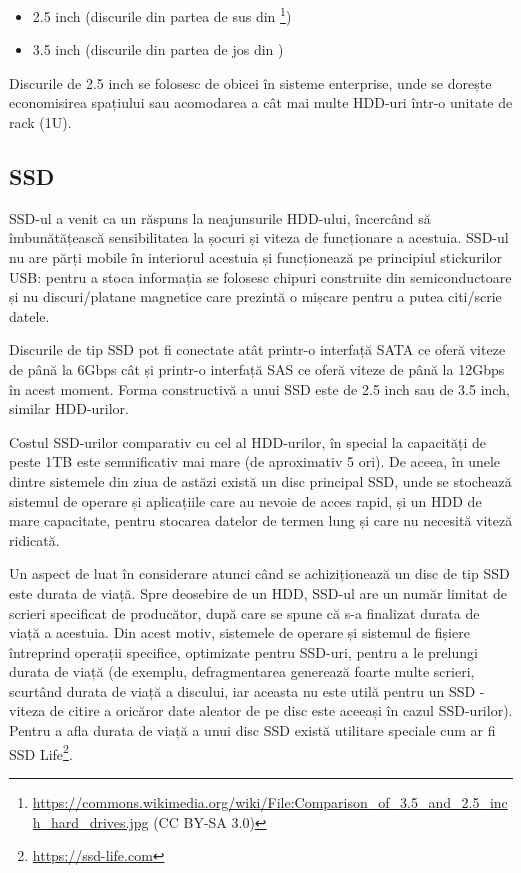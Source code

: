 \begin{itemize}
  \item 2.5 inch (discurile din partea de sus din \footnote{\url{https://commons.wikimedia.org/wiki/File:Comparison\_of\_3.5\_and\_2.5\_inch\_hard\_drives.jpg} (CC BY-SA 3.0)})
  \item 3.5 inch (discurile din partea de jos din )
\end{itemize}

Discurile de 2.5 inch se folosesc de obicei în sisteme enterprise, unde se dorește economisirea spațiului sau acomodarea a cât mai multe HDD-uri într-o unitate de rack (1U).

\subsection{SSD}
\label{sec:storage:type:ssd}

SSD-ul a venit ca un răspuns la neajunsurile HDD-ului, încercând să îmbunătățească sensibilitatea la șocuri și viteza de funcționare a acestuia.
SSD-ul nu are părți mobile în interiorul acestuia și funcționează pe principiul stickurilor USB: pentru a stoca informația se folosesc chipuri construite din semiconductoare și nu discuri/platane magnetice care prezintă o mișcare pentru a putea citi/scrie datele.

Discurile de tip SSD pot fi conectate atât printr-o interfață SATA ce oferă viteze de până la 6Gbps cât și printr-o interfață SAS ce oferă viteze de până la 12Gbps în acest moment.
Forma constructivă a unui SSD este de 2.5 inch sau de 3.5 inch, similar HDD-urilor.

Costul SSD-urilor comparativ cu cel al HDD-urilor, în special la capacități de peste 1TB este semnificativ mai mare (de aproximativ 5 ori).
De aceea, în unele dintre sistemele din ziua de astăzi există un disc principal SSD, unde se stochează sistemul de operare și aplicațiile care au nevoie de acces rapid, și un HDD de mare capacitate, pentru stocarea datelor de termen lung și care nu necesită viteză ridicată.

Un aspect de luat în considerare atunci când se achiziționează un disc de tip SSD este durata de viață.
Spre deosebire de un HDD, SSD-ul are un număr limitat de scrieri specificat de producător, după care se spune că s-a finalizat durata de viață a acestuia.
Din acest motiv, sistemele de operare și sistemul de fișiere întreprind operații specifice, optimizate pentru SSD-uri, pentru a le prelungi durata de viață (de exemplu, defragmentarea generează foarte multe scrieri, scurtând durata de viață a discului, iar aceasta nu este utilă pentru un SSD - viteza de citire a oricăror date aleator de pe disc este aceeași în cazul SSD-urilor).
Pentru a afla durata de viață a unui disc SSD există utilitare speciale cum ar fi SSD Life\footnote{\url{https://ssd-life.com}}.

